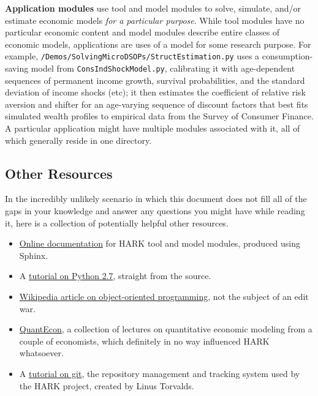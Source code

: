 \documentclass[12pt,titlepage,letterpaper]{econtex}
\begin{document}
{\textbf{Application modules} use tool and model modules to solve, simulate, and/or estimate economic models \textit{for a particular purpose}.  While tool modules have no particular economic content and model modules describe entire classes of economic models, applications are uses of a model for some research purpose.  For example, \texttt{/Demos/SolvingMicroDSOPs/StructEstimation.py} uses a consumption-saving model from \texttt{ConsIndShockModel.py}, calibrating it with age-dependent sequences of permanent income growth, survival probabilities, and the standard deviation of income shocks (etc); it then estimates the coefficient of relative risk aversion and shifter for an age-varying sequence of discount factors that best fits simulated wealth profiles to empirical data from the Survey of Consumer Finance.  A particular application might have multiple modules associated with it, all of which generally reside in one directory.

\subsection{Other Resources}\label{sec:OtherResources}

In the incredibly unlikely scenario in which this document does not fill all of the gaps in your knowledge and answer any questions you might have while reading it, here is a collection of potentially helpful other resources.

\begin{itemize}

\item \href{https://econ-ark.github.io/HARK/}{Online documentation} for HARK tool and model modules, produced using Sphinx.

\item A \href{https://docs.python.org/2.7/tutorial/}{tutorial on Python 2.7}, straight from the source.

\item \href{https://en.wikipedia.org/wiki/Object-oriented_programming}{Wikipedia article on object-oriented programming}, not the subject of an edit war.

\item \href{http://quant-econ.net/}{QuantEcon}, a collection of lectures on quantitative economic modeling from a couple of economists, which definitely in no way influenced HARK whatsoever.

\item A \href{https://www.atlassian.com/git/tutorials/}{tutorial on git}, the repository management and tracking system used by the HARK project, created by Linus Torvalds.


\end{itemize}}
\end{document}
